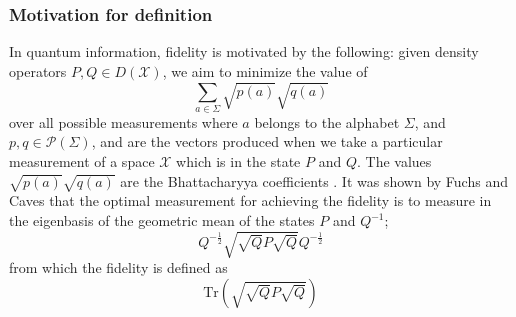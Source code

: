 \documentclass{amsart}
\numberwithin{equation}{section}
\theoremstyle{definition}
\theoremstyle{plain}
\theoremstyle{solutionstyle}
\begin{document}
\subsubsection{Motivation for definition}
In quantum information, fidelity is motivated by the following: given density operators $P,Q\in D(\mathcal{X})$, we aim to minimize the value of 
\begin{equation*}\sum_{a\in \Sigma} \sqrt{p(a)}\sqrt{q(a)}\end{equation*} 
over all possible measurements where $a$ belongs to the alphabet $\Sigma$, and $p,q\in \mathcal{P}(\Sigma)$, and are the vectors produced when we take a particular measurement of a space $\mathcal{X}$ which is in the state $P$ and $Q$. The values $\sqrt{p(a)}\sqrt{q(a)}$ are the Bhattacharyya coefficients \cite{Watrous_2018}. It was shown by Fuchs and Caves \cite{fuchs1996mathematicaltechniquesquantumcommunication} that the optimal measurement for achieving the fidelity is to measure in the eigenbasis of the geometric mean of the states $P$ and $Q^{-1}$; \begin{equation*}Q^{-\frac{1}{2}}\sqrt{\sqrt{Q}P\sqrt{Q}}Q^{-\frac{1}{2}}\end{equation*} from which the fidelity is defined as 
\begin{equation*}\mathrm{Tr}\left(\sqrt{\sqrt{Q}P\sqrt{Q}}\right)\end{equation*}
\end{document}
